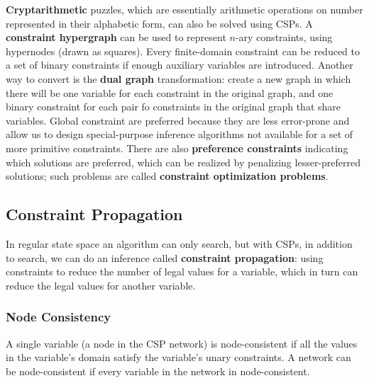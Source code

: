 \documentclass[twoside]{article}
\begin{document}
\textbf{Cryptarithmetic} puzzles, which are essentially arithmetic operations
on number represented in their alphabetic form, can also be solved using CSPs.
A \textbf{constraint hypergraph} can be used to represent \(n\)-ary constraints,
using hypernodes (drawn as squares). Every finite-domain constraint can be 
reduced to a set of binary constraints if enough auxiliary variables are 
introduced. Another way to convert is the \textbf{dual graph} transformation:
create a new graph in which there will be one variable for each constraint in 
the original graph, and one binary constraint for each pair fo constraints in
the original graph that share variables. Global constraint are preferred because
they are less error-prone and allow us to design special-purpose inference 
algorithms not available for a set of more primitive constraints. There are
also \textbf{preference constraints} indicating which solutions are preferred,
which can be realized by penalizing lesser-preferred solutions; such problems
are called \textbf{constraint optimization problems}.
\subsection{Constraint Propagation}
In regular state space an algorithm can only search, but with CSPs, in addition
to search, we can do an inference called \textbf{constraint propagation}: using
constraints to reduce the number of legal values for a variable, which in turn 
can reduce the legal values for another variable.
\subsubsection{Node Consistency}
A single variable (a node in the CSP network) is node-consistent if all the 
values in the variable's domain satisfy the variable's unary constraints. A 
network can be node-consistent if every variable in the network in node-consistent.
\end{document}
